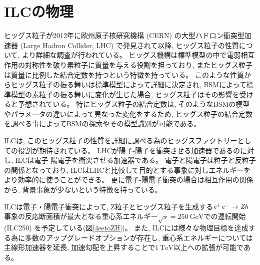 \section{ILCの物理} \label{Intro:PhysicsofILC}

ヒッグス粒子が2012年に欧州原子核研究機構 (CERN) の大型ハドロン衝突型加速器 (Large Hadron Collider, LHC) で発見されて以降, ヒッグス粒子の性質について, より詳細な調査が行われている。
ヒッグス機構は標準模型の中で電弱相互作用の対称性を破り素粒子に質量を与える役割を担っており, またヒッグス粒子は質量に比例した結合定数を持つという特徴を持っている。
このような性質からヒッグス粒子の振る舞いは標準模型によって詳細に決定され, BSMによって標準模型の素粒子の振る舞いに変化が生じた場合, ヒッグス粒子はその影響を受けると予想されている。
特にヒッグス粒子の結合定数は, そのようなBSMの模型やパラメータの違いによって異なった変化をするため, ヒッグス粒子の結合定数を調べる事によってBSMの探索やその模型識別が可能である。

ILCは, このヒッグス粒子の性質を詳細に調べる為のヒッグスファクトリーとしての役割が期待されている。
LHCが陽子-陽子を衝突させる加速器であるのに対し, ILCは電子-陽電子を衝突させる加速器である。
電子と陽電子は粒子と反粒子の関係となっており, ILCはLHCと比較して目的とする事象に対しエネルギーをより効率的に使うことができる。
更に電子-陽電子衝突の場合は相互作用の関係から, 背景事象が少ないという特徴を持っている。

ILCは電子・陽電子衝突によって, Z粒子とヒッグス粒子を生成する$\it e^+e^- \to Zh$事象の反応断面積が最大となる重心系エネルギー$\sqrt{s}=250\ \mathrm{GeV}$での運転開始 (ILC250) を予定している(図\ref{4eetoZH})。
また, ILCには様々な物理目標を達成する為に多数のアップグレードオプションが存在し, 重心系エネルギーについては主線形加速器を延長, 加速勾配を上昇することで$1\ \mathrm{TeV}$以上への拡張が可能である。\\


